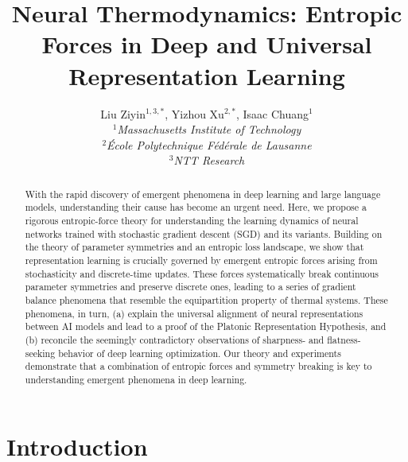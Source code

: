 \documentclass{article}
\title{Neural Thermodynamics: Entropic Forces in Deep and Universal Representation Learning}
\theoremstyle{plain}
\begin{document}
\author{Liu Ziyin$^{1,3,*}$, Yizhou Xu$^{2,*}$, Isaac Chuang$^1$\\
$^1$\textit{Massachusetts Institute of Technology}\\
$^2$\textit{École Polytechnique Fédérale de Lausanne}\\
$^3$\textit{NTT Research}
}
\maketitle
\def\thefootnote{*}\def\thefootnote{\arabic{footnote}}


\begin{abstract}
With the rapid discovery of emergent phenomena in deep learning and large language models, understanding their cause has become an urgent need. Here, we propose a rigorous entropic-force theory for understanding the learning dynamics of neural networks trained with stochastic gradient descent (SGD) and its variants. Building on the theory of parameter symmetries and an entropic loss landscape, we show that representation learning is crucially governed by emergent entropic forces arising from stochasticity and discrete-time updates. These forces systematically break continuous parameter symmetries and preserve discrete ones, leading to a series of gradient balance phenomena that resemble the equipartition property of thermal systems. These phenomena, in turn, (a) explain the universal alignment of neural representations between AI models and lead to a proof of the Platonic Representation Hypothesis, and (b) reconcile the seemingly contradictory observations of sharpness- and flatness-seeking behavior of deep learning optimization. Our theory and experiments demonstrate that a combination of entropic forces and symmetry breaking is key to understanding emergent phenomena in deep learning.
\end{abstract}


\vspace{-2mm}
\section{Introduction}
\vspace{-1mm}
\end{document}
